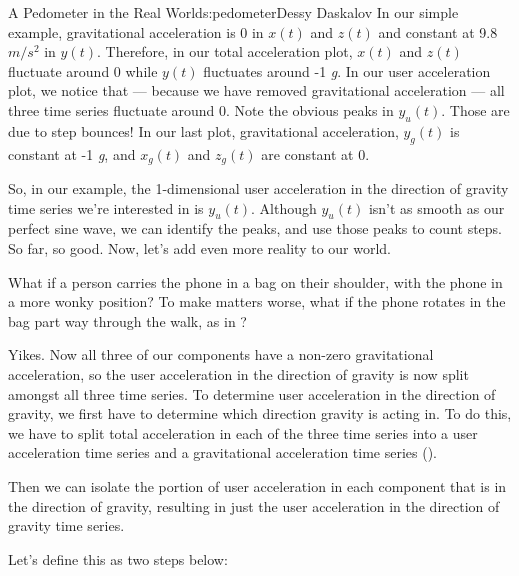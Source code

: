 \begin{aosachapter}{A Pedometer in the Real World}{s:pedometer}{Dessy Daskalov}
In our simple example, gravitational acceleration is 0 in $x(t)$ and
$z(t)$ and constant at 9.8 $m/s^2$ in $y(t)$. Therefore, in our total
acceleration plot, $x(t)$ and $z(t)$ fluctuate around 0 while $y(t)$
fluctuates around -1 \emph{g}. In our user acceleration plot, we notice
that --- because we have removed gravitational acceleration --- all
three time series fluctuate around 0. Note the obvious peaks in
$y_{u}(t)$. Those are due to step bounces! In our last plot,
gravitational acceleration, $y_{g}(t)$ is constant at -1 \emph{g}, and
$x_{g}(t)$ and $z_{g}(t)$ are constant at 0.

So, in our example, the 1-dimensional user acceleration in the direction
of gravity time series we're interested in is $y_{u}(t)$. Although
$y_{u}(t)$ isn't as smooth as our perfect sine wave, we can identify the
peaks, and use those peaks to count steps. So far, so good. Now, let's
add even more reality to our world.

\label{people-are-complicated-creatures}

What if a person carries the phone in a bag on their shoulder, with the
phone in a more wonky position? To make matters worse, what if the phone
rotates in the bag part way through the walk, as in
?


Yikes. Now all three of our components have a non-zero gravitational
acceleration, so the user acceleration in the direction of gravity is
now split amongst all three time series. To determine user acceleration
in the direction of gravity, we first have to determine which direction
gravity is acting in. To do this, we have to split total acceleration in
each of the three time series into a user acceleration time series and a
gravitational acceleration time series
().


Then we can isolate the portion of user acceleration in each component
that is in the direction of gravity, resulting in just the user
acceleration in the direction of gravity time series.

Let's define this as two steps below:

\begin{aosaenumerate}
\def\labelenumi{\arabic{enumi}.}


\end{aosaenumerate}
\end{aosachapter}
